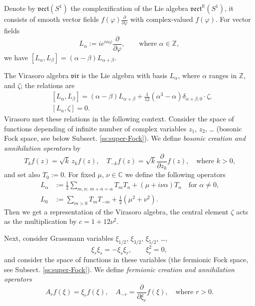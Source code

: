 \documentclass[]{amsart}
\newcounter{sec}
\def\phi{\varphi}
\def\R {{\mathbb R }}
\def\C {{\mathbb C }}
\def\Z{{\mathbb Z}}
\def\sm{\smallskip}
\def\vect{\mathfrak{vect}}
\def\vir{\mathfrak{vir}}
\begin{document}
Denote by $\vect(S^1)$ the complexification of the Lie algebra
 $\vect^\R(S^1)$, it consists
of smooth vector fields $f(\phi)\frac\partial{\partial \phi}$
with complex-valued $f(\phi)$.
For vector fields 
$$
L_\alpha:=ie^{i\alpha \phi} \frac\partial{\partial \phi},\qquad
\text{where $\alpha\in \Z$},
$$
we have $[L_\alpha,L_\beta]=(\alpha-\beta)L_{\alpha+\beta}$.


The Virasoro algebra $\vir$ is the Lie algebra
with basis $L_\alpha$, where $\alpha$ ranges in $\Z$,
 and $\zeta$; the relations are 
 \begin{align}
& [L_\alpha,L_\beta]=(\alpha-\beta)L_{\alpha+\beta}+
\tfrac 1{12}(\alpha^3-\alpha)\delta_{\alpha+\beta,0}\cdot \zeta,
\label{eq:vir1}
\\
&[L_n,\zeta]=0.
\label{eq:vir2}
 \end{align}
 Virasoro met these relations  in the following context.
Consider the space of functions depending of infinite
number of complex variables $z_1$, $z_2$, \dots\vphantom{.}
(bosonic Fock space, see below Subsect. \ref{ss:super-Fock}).
We define {\it bosonic creation and annihilation operators} by
\begin{equation}
T_k f(z)=\sqrt k\, z_k f(z), \quad T_{-k} f(z)=\sqrt k \frac\partial{\partial z_k} f(z),\quad \text{where $k>0$,}
\label{eq:boson-cran}
\end{equation}
and set also $T_0:=0$. For fixed $\mu$, $\nu\in \C$
we define the following operators
\begin{align}
L_\alpha&:=\frac12 \sum_{m,n:\,m+n=\alpha} T_m T_n
+(\mu+i\nu \alpha) T_n \quad\text{for $\alpha\ne 0$,}
\label{eq:L-alpha}
\\
L_0&:=  \sum_{m>0} T_m T_{-m}+\frac12(\mu^2+\nu^2).
\label{eq:L-0}
\end{align}
 Then we get a representation of the Virasoro
algebra, the central element $\zeta$ acts as the multiplication
by $c=1+12 \nu^2$. 

\sm

Next, 
consider  Grassmann variables
$\xi_{1/2}$, $\xi_{3/2}$,  $\xi_{5/2}$, \dots,
$$
\xi_r\xi_s=- \xi_s\xi_r, \qquad \xi_r^2=0,
$$
and consider the space of functions in these variables
  (the fermionic Fock space, see Subsect. \ref{ss:super-Fock}).
 We define {\it fermionic creation and annihilation operators}
\begin{equation}
	A_r f(\xi)=\xi_r f(\xi),\quad A_{-r}
	=\frac\partial{\partial \xi_r} f(\xi), \quad \text{where $r>0$.}
	\label{eq:f-c-a}
\end{equation}
\end{document}
